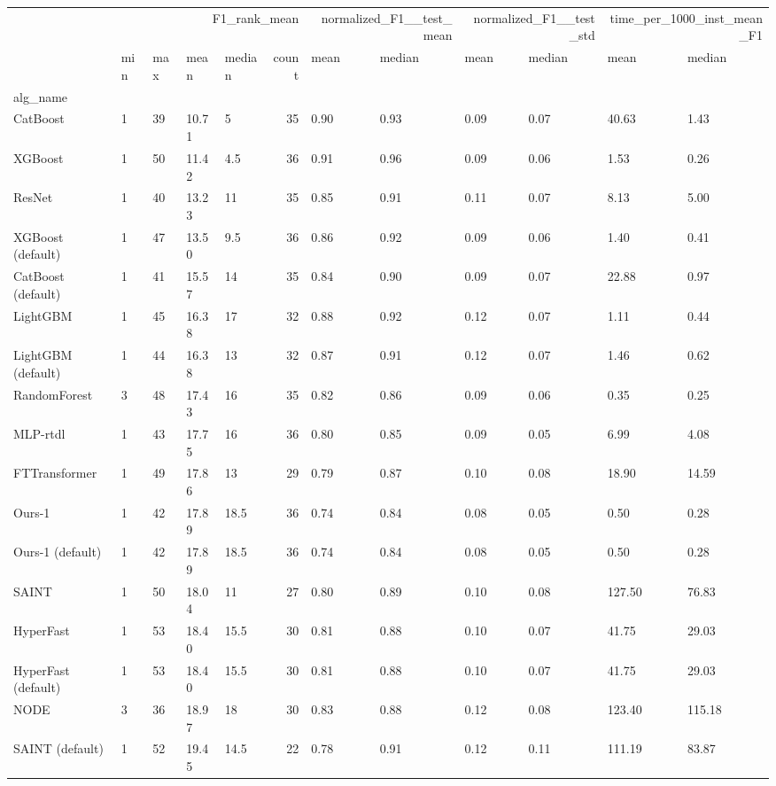 \begin{tabular}{lllllrllllll}
\toprule
 & \multicolumn{5}{r}{F1_rank_mean} & \multicolumn{2}{r}{normalized_F1__test_mean} & \multicolumn{2}{r}{normalized_F1__test_std} & \multicolumn{2}{r}{time_per_1000_inst_mean_F1} \\
 & min & max & mean & median & count & mean & median & mean & median & mean & median \\
alg_name &  &  &  &  &  &  &  &  &  &  &  \\
\midrule
CatBoost & 1 & 39 & 10.71 & 5 & 35 & 0.90 & 0.93 & 0.09 & 0.07 & 40.63 & 1.43 \\
XGBoost & 1 & 50 & 11.42 & 4.5 & 36 & 0.91 & 0.96 & 0.09 & 0.06 & 1.53 & 0.26 \\
ResNet & 1 & 40 & 13.23 & 11 & 35 & 0.85 & 0.91 & 0.11 & 0.07 & 8.13 & 5.00 \\
XGBoost (default) & 1 & 47 & 13.50 & 9.5 & 36 & 0.86 & 0.92 & 0.09 & 0.06 & 1.40 & 0.41 \\
CatBoost (default) & 1 & 41 & 15.57 & 14 & 35 & 0.84 & 0.90 & 0.09 & 0.07 & 22.88 & 0.97 \\
LightGBM & 1 & 45 & 16.38 & 17 & 32 & 0.88 & 0.92 & 0.12 & 0.07 & 1.11 & 0.44 \\
LightGBM (default) & 1 & 44 & 16.38 & 13 & 32 & 0.87 & 0.91 & 0.12 & 0.07 & 1.46 & 0.62 \\
RandomForest & 3 & 48 & 17.43 & 16 & 35 & 0.82 & 0.86 & 0.09 & 0.06 & 0.35 & 0.25 \\
MLP-rtdl & 1 & 43 & 17.75 & 16 & 36 & 0.80 & 0.85 & 0.09 & 0.05 & 6.99 & 4.08 \\
FTTransformer & 1 & 49 & 17.86 & 13 & 29 & 0.79 & 0.87 & 0.10 & 0.08 & 18.90 & 14.59 \\
Ours-1 & 1 & 42 & 17.89 & 18.5 & 36 & 0.74 & 0.84 & 0.08 & 0.05 & 0.50 & 0.28 \\
Ours-1 (default) & 1 & 42 & 17.89 & 18.5 & 36 & 0.74 & 0.84 & 0.08 & 0.05 & 0.50 & 0.28 \\
SAINT & 1 & 50 & 18.04 & 11 & 27 & 0.80 & 0.89 & 0.10 & 0.08 & 127.50 & 76.83 \\
HyperFast & 1 & 53 & 18.40 & 15.5 & 30 & 0.81 & 0.88 & 0.10 & 0.07 & 41.75 & 29.03 \\
HyperFast (default) & 1 & 53 & 18.40 & 15.5 & 30 & 0.81 & 0.88 & 0.10 & 0.07 & 41.75 & 29.03 \\
NODE & 3 & 36 & 18.97 & 18 & 30 & 0.83 & 0.88 & 0.12 & 0.08 & 123.40 & 115.18 \\
SAINT (default) & 1 & 52 & 19.45 & 14.5 & 22 & 0.78 & 0.91 & 0.12 & 0.11 & 111.19 & 83.87 \\

\end{tabular}
